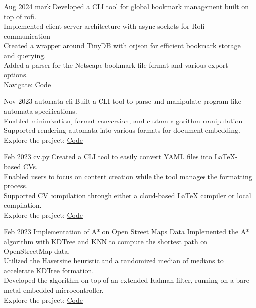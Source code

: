 \documentclass[hidelinks]{report}
\begin{document}

\entry
    {Aug 2024}
    {mark}
    {} {}
    {
    \textbullet Developed a CLI tool for global bookmark management built on top of rofi.\\ 
    \textbullet Implemented client-server architecture with async sockets for Rofi communication.\\
    \textbullet Created a wrapper around TinyDB with orjson for efficient bookmark storage and querying.\\ 
    \textbullet Added a parser for the Netscape bookmark file format and various export options.\\
    \textbullet Navigate: \href{\github/mark}{\underline{Code}}
    }

\entry
    {Nov 2023}
    {automata-cli}
    {} {}
    {
    \textbullet Built a CLI tool to parse and manipulate program-like automata specifications. \\ 
    \textbullet Enabled minimization, format conversion, and custom algorithm manipulation. \\ 
    \textbullet Supported rendering automata into various formats for document embedding.\\
    \textbullet Explore the project: \href{\github/automata-cli}{\underline{Code}}
    }

\entry
    {Feb 2023}
    {cv.py}
    {} {}  
    {
    \textbullet Created a CLI tool to easily convert YAML files into LaTeX-based CVs.\\
    \textbullet Enabled users to focus on content creation while the tool manages the formatting process.\\
    \textbullet Supported CV compilation through either a cloud-based LaTeX compiler or local compilation.\\
    \textbullet Explore the project: \href{\github/CV.py}{\underline{Code}}
    }

\entry
    {Feb 2023}
    {Implementation of A* on Open Street Maps Data }
    {} {}    
    {
       \textbullet Implemented the A* algorithm with KDTree and KNN to compute the shortest path on OpenStreetMap data.\\
       \textbullet Utilized the Haversine heuristic and a randomized median of medians to accelerate KDTree formation. \\
       \textbullet Developed the algorithm on top of an extended Kalman filter, running on a bare-metal embedded microcontroller.\\
       \textbullet Explore the project: \href{\github/Astar-OSM}{\underline{Code}}
    }
\end{document}
